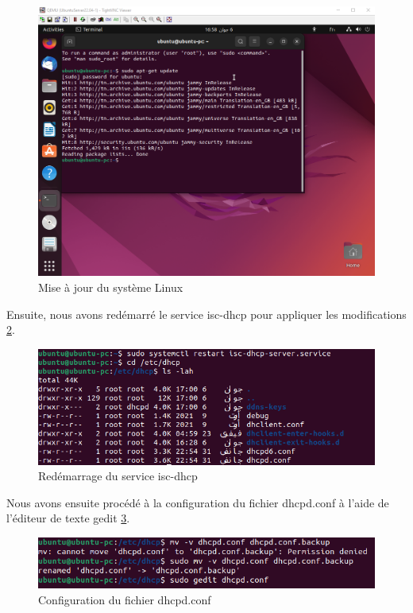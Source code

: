 \begin{figure}[H]
 \centering
    \includegraphics[width=15cm]{Images/dhcp1.png}
    \caption{Mise à jour du système Linux}
    \label{fig:update-linux}
\end{figure}

Ensuite, nous avons redémarré le service isc-dhcp pour appliquer les modifications \ref{fig:restart-isc-dhcp}. \\

\begin{figure}[H]
 \centering
    \includegraphics[width=15cm]{Images/dhcp2.png}
    \caption{Redémarrage du service isc-dhcp}
    \label{fig:restart-isc-dhcp}
\end{figure}

Nous avons ensuite procédé à la configuration du fichier dhcpd.conf à l'aide de l'éditeur de texte gedit \ref{fig:dhcpd-conf-configuration}. \\

\begin{figure}[H]
 \centering
    \includegraphics[width=15cm]{Images/dhcp3.png}
    \caption{Configuration du fichier dhcpd.conf}
    \label{fig:dhcpd-conf-configuration}
\end{figure}

